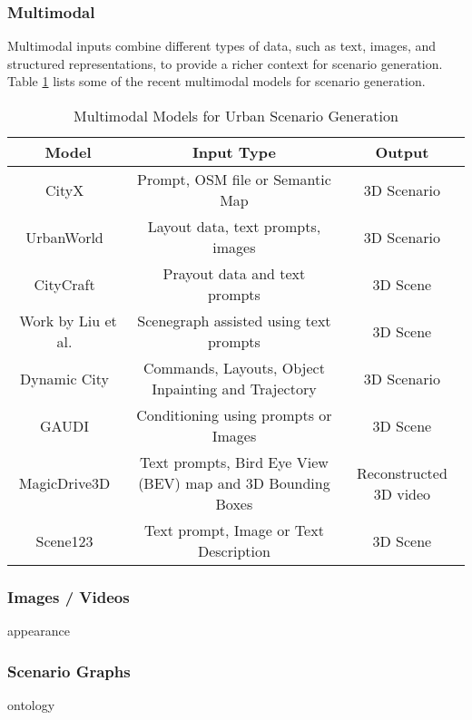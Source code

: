 \documentclass{article}
\begin{document}
\subsubsection{Multimodal}

Multimodal inputs combine different types of data, such as text, images, and structured representations, to provide a richer context for scenario generation. Table \ref{tab:multimodal_models} lists some of the recent multimodal models for scenario generation.

\begin{table}[ht]
\centering
    \begin{tabular}{|c|c|c|}
    \hline
    \textbf{Model} & \textbf{Input Type} & \textbf{Output} \\ \hline
    CityX~\cite{zhang2024cityx} & Prompt, OSM file or Semantic Map & 3D Scenario \\ \hline
    UrbanWorld~\cite{shang2024urbanworld} & Layout data, text prompts, images & 3D Scenario \\ \hline
    CityCraft~\cite{deng2024citycraft} & Prayout data and text prompts & 3D Scene \\ \hline
    Work by Liu et al.~\cite{liu2025controllable} & Scenegraph assisted using text prompts & 3D Scene \\ \hline
    Dynamic City~\cite{bian2024dynamiccity} & Commands, Layouts, Object Inpainting and Trajectory & 3D Scenario \\ \hline
    GAUDI~\cite{bautista2022gaudi} & Conditioning using prompts or Images & 3D Scene \\ \hline
    MagicDrive3D~\cite{gao2024magicdrive3d} & Text prompts, Bird Eye View (BEV) map and 3D Bounding Boxes & Reconstructed 3D video \\ \hline
    Scene123~\cite{yang2024scene123} & Text prompt, Image or Text Description & 3D Scene \\ \hline
    \end{tabular}
\caption{Multimodal Models for Urban Scenario Generation}
\label{tab:multimodal_models}


\subsubsection{Images / Videos}
appearance

\subsubsection{Scenario Graphs}
ontology


\end{table}
\end{document}

